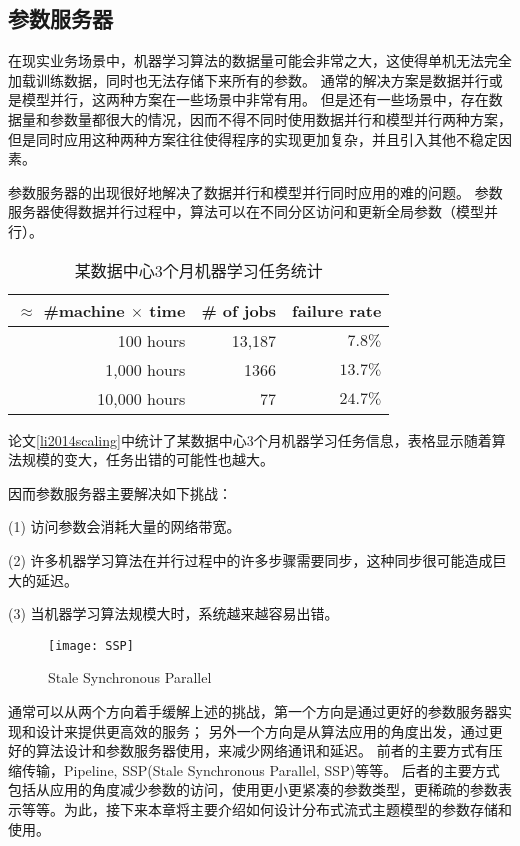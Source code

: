\subsection{参数服务器}
在现实业务场景中，机器学习算法的数据量可能会非常之大，这使得单机无法完全加载训练数据，同时也无法存储下来所有的参数。
通常的解决方案是数据并行或是模型并行，这两种方案在一些场景中非常有用。
但是还有一些场景中，存在数据量和参数量都很大的情况，因而不得不同时使用数据并行和模型并行两种方案，但是同时应用这种两种方案往往使得程序的实现更加复杂，并且引入其他不稳定因素。

参数服务器的出现很好地解决了数据并行和模型并行同时应用的难的问题。
参数服务器使得数据并行过程中，算法可以在不同分区访问和更新全局参数（模型并行）。

\begin{table}\label{tab:jobs_failed} 
\center
\caption{某数据中心3个月机器学习任务统计}
\begin{tabular}{|r|r|r|}
\hline
$\approx$ \#machine $\times$ time & \# of jobs& failure rate \\
\hline
100 hours & 13,187 & $7.8\%$ \\
1,000 hours & 1366 & $13.7\%$ \\
10,000 hours & 77 & $24.7\%$ \\
\hline
\end{tabular}
\end{table}

论文\ref{li2014scaling}中统计了某数据中心3个月机器学习任务信息，表格显示随着算法规模的变大，任务出错的可能性也越大。

因而参数服务器主要解决如下挑战：

(1) 访问参数会消耗大量的网络带宽。

(2) 许多机器学习算法在并行过程中的许多步骤需要同步，这种同步很可能造成巨大的延迟。

(3) 当机器学习算法规模大时，系统越来越容易出错。


\begin{figure}[htb]\centering
\texttt{[image: SSP]}
\caption{Stale Synchronous Parallel}
\label{fig:SSP}       %
\end{figure}

通常可以从两个方向着手缓解上述的挑战，第一个方向是通过更好的参数服务器实现和设计来提供更高效的服务；
另外一个方向是从算法应用的角度出发，通过更好的算法设计和参数服务器使用，来减少网络通讯和延迟。
前者的主要方式有压缩传输，Pipeline, SSP(Stale Synchronous Parallel, SSP)等等。
后者的主要方式包括从应用的角度减少参数的访问，使用更小更紧凑的参数类型，更稀疏的参数表示等等。为此，接下来本章将主要介绍如何设计分布式流式主题模型的参数存储和使用。


